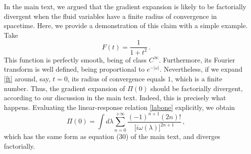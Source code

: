 \documentclass[a4paper, amsfonts, amssymb, amsmath, reprint, showkeys, twoside,notitlepage]{revtex4-2}
\begin{document}
In the main text, we argued that the gradient expansion is likely to be factorially divergent when the fluid variables have a finite radius of convergence in spacetime. Here, we provide a demonstration of this claim with a simple example. 
Take
\begin{equation}\label{ft}
    F(t)= \dfrac{1}{1+t^2} \, .
\end{equation}
This function is perfectly smooth, being of class $C^{\infty}$. Furthermore, its Fourier transform is well defined, being proportional to $e^{-|\omega|}$. Nevertheless, if we expand \eqref{ft} around, say, $t=0$, its radius of convergence equals $1$, which is a finite number. Thus, the gradient expansion of $\Pi(0)$ should be factorially divergent, according to our discussion in the main text. Indeed, this is precisely what happens. Evaluating the linear-response relation \eqref{labone} explicitly, we obtain
\begin{equation}
\Pi(0) = \int d\lambda \sum_{n=0}^{+\infty} \dfrac{(-1)^{n+1}  (2n)!}{\big[i\omega(\lambda)\big]^{2n+1}} \, ,
\end{equation}
which has the same form as equation (30) of the main text, and diverges factorially.



































\newpage


\label{lastpage}
\end{document}
